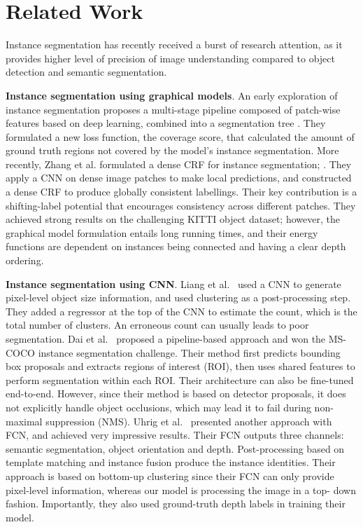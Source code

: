 \section{Related Work}

Instance segmentation has recently received a burst of research attention, as
it provides higher level of precision of image understanding compared to object
detection and semantic segmentation.

\textbf{Instance segmentation using graphical models}. An early exploration of
instance segmentation proposes a multi-stage pipeline composed of patch-wise
features based on deep learning, combined into a segmentation tree
\cite{silberman14insseg}. They formulated a new loss function, the coverage
score, that calculated the amount of ground truth regions not covered by the
model's instance segmentation. More recently, Zhang et al. \cite{zhang16insseg}
formulated a dense CRF for instance segmentation; .  They apply a CNN on dense
image patches to make local predictions, and constructed a dense CRF to produce
globally consistent labellings. Their key contribution is a shifting-label
potential that encourages consistency across different patches. They achieved
strong results on the challenging KITTI object dataset; however, the graphical
model formulation entails long running times, and their energy functions are
dependent on instances being connected and having a clear depth ordering.

\textbf{Instance segmentation using CNN}. Liang et al.~\cite{liang15pfinsseg}
used a CNN to generate pixel-level object size information, and used clustering
as a post-processing step. They added a regressor at the top of the CNN to
estimate the count, which is the total number of clusters. An erroneous count
can usually leads to poor segmentation. Dai et al.~\cite{dai15insaware}
proposed a pipeline-based approach and won the MS-COCO instance segmentation
challenge. Their method first predicts bounding box proposals and extracts
regions of interest (ROI), then uses shared features to perform segmentation
within each ROI. Their architecture can also be fine-tuned end-to-end. However,
since their method is based on detector proposals, it does not explicitly
handle object occlusions, which may lead it to fail during  non- maximal
suppression (NMS). Uhrig et al.~\cite{uhrig16insseg} presented another approach
with FCN, and achieved very impressive results. Their FCN outputs three
channels: semantic segmentation, object orientation and depth. Post-processing
based on template matching and instance fusion produce the instance identities.
Their approach is based on bottom-up clustering since their FCN can only
provide pixel-level information, whereas our model is processing the image in a
top- down fashion. Importantly, they also used ground-truth depth labels in
training their model.


